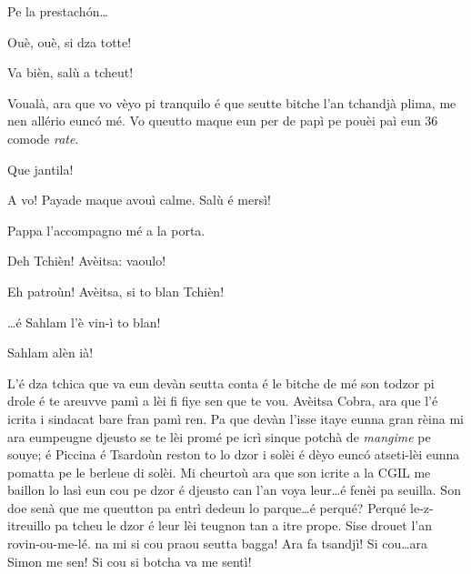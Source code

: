 \begin{drama}
\Trincherospeaks Pe la prestach\'on\ldots

\Cienspeaks Ouè, ouè, si dza totte!

\Trincherospeaks Va bièn, salù a tcheut!


\Chefspeaks Voualà, ara que vo vèyo pi tranquilo é que seutte bitche l’an tchandjà plima, me nen allério eunc\'o mé. Vo queutto ma\-que eun per de papì pe pouèi paì eun 36 comode \textit{rate}.

\Cienspeaks Que jantila!


\Cienspeaks A vo! Payade maque avouì calme. Salù é mersì!

\Simonspeaks Pappa l’accompagno mé a la porta.


\Cienspeaks Deh Tchièn! Avèitsa: vaoulo!


\Sahlammspeaks Eh patroùn! Avèitsa, si to blan Tchièn! 

\Mariettospeaks \ldots é Sahlam l'è vin-ì to blan! 


\Mariettospeaks Sahlam alèn ià!





\scene[-- La morale]


\Cienspeaks {} L’é dza tchica que va eun devàn seutta conta é le bitche de mé son todzor pi drole é te areuvve pamì a lèi fi fiye sen que te vou. Avèitsa Cobra, ara que l’é icrita i sindacat bare fran pamì ren. Pa que devàn l’isse itaye eunna gran rèina mi ara eumpeugne djeusto se te lèi promé pe icrì sinque potchà de \textit{mangime} pe souye; é Piccina é Tsardoùn reston to lo dzor i solèi é dèyo eunc\'o atseti-lèi eunna pomatta pe le berleue di solèi. Mi cheurtoù ara que son icrite a la CGIL me baillon lo lasì eun cou pe dzor é djeusto can l’an voya leur\ldots é fenèi pa seuilla. Son doe senà que me queutton pa entrì dedeun lo parque\ldots é perqué? Perqué le-z-itreuillo pa tcheu le dzor é leur lèi teugnon tan a itre prope.  Sise drouet l’an rovin-ou-me-lé.  na mi si cou praou seutta bagga!  Ara fa tsandjì! Si cou\ldots ara Simon me sen! Si cou si botcha va me sentì!


\end{drama}
